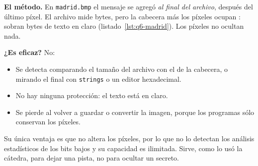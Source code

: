 
\textbf{El método.} En \texttt{madrid.bmp} el mensaje se agregó \emph{al final del archivo}, después del último píxel. El archivo mide
 bytes, pero la cabecera más los píxeles ocupan : sobran  bytes de texto en claro
(listado~\ref{lst:q6-madrid}). Los píxeles no ocultan nada.



\textbf{¿Es eficaz?} No:
\begin{itemize}
\item Se detecta comparando el tamaño del archivo con el de la cabecera, o mirando el final con \texttt{strings} o un editor hexadecimal.
\item No hay ninguna protección: el texto está en claro.
\item Se pierde al volver a guardar o convertir la imagen, porque los programas sólo conservan los píxeles.
\end{itemize}
Su única ventaja es que no altera los píxeles, por lo que no lo detectan los análisis estadísticos de los bits bajos y su capacidad es ilimitada. Sirve, como
lo usó la cátedra, para dejar una pista, no para ocultar un secreto.

